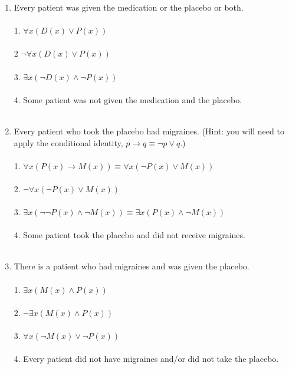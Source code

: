 \documentclass{amsart}
\theoremstyle{definition}
\theoremstyle{Exercise}
\theoremstyle{remark}
\theoremstyle{rule}
\numberwithin{equation}{section}
\begin{document}
\begin{enumerate}[label=(\alph*)]

\item Every patient was given the medication or the placebo or both.\\\\
1.  $\forall x (D(x) \lor P(x))$\\\\
2   $\neg \forall x (D(x) \lor P(x))$\\\\
3.  $\exists x (\neg D(x) \land \neg P(x))$\\\\
4.  Some patient was not given the medication and the placebo.
\\\\
\item Every patient who took the placebo had migraines. (Hint: you will need to apply the conditional identity, $p \to q \equiv \neg p \lor q$.)\\\\
1. $\forall x (P(x) \to M(x)) \equiv \forall x (\neg P(x) \lor M(x))$\\\\
2. $\neg \forall x (\neg P(x) \lor M(x))$\\\\
3. $\exists x (\neg \neg P(x) \land \neg M(x)) \equiv \exists x (P(x) \land \neg M(x))$\\\\
4. Some patient took the placebo and did not receive migraines.
\\\\
\item There is a patient who had migraines and was given the placebo.\\\\
1. $\exists x (M(x) \land P(x))$\\\\
2. $\neg \exists x (M(x) \land P(x))$\\\\
3. $\forall x (\neg M(x) \lor \neg P(x))$\\\\
4. Every patient did not have migraines and/or did not take the placebo.
\\\\
\end{enumerate}
\end{document}
